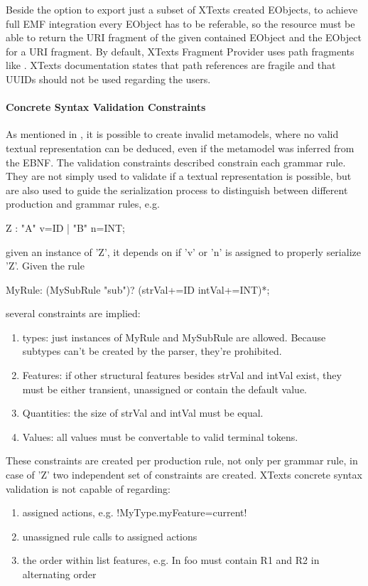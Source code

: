 Beside the option to export just a subset of XTexts created EObjects, to achieve full EMF integration every EObject has to be referable, so the resource must be able to return the URI fragment of the given contained EObject and the EObject for a URI fragment. By default, XTexts Fragment Provider  uses path fragments like . XTexts documentation states that path references are fragile and that UUIDs should not be used regarding the users. 

\paragraph{Concrete Syntax Validation Constraints}
As mentioned in \cite{MofCfg}, it is possible to create invalid metamodels, where no valid textual representation can be deduced, even if the metamodel was inferred from the EBNF. The validation constraints described constrain each grammar rule. They are not simply used to validate if a textual representation is possible, but are also used to guide the serialization process to distinguish between different production and grammar rules, e.g.
\begin{xtxt}
Z 	:  "A" v=ID  
	|  "B" n=INT;
\end{xtxt}
given an instance of 'Z', it depends on if 'v' or 'n' is assigned to properly serialize 'Z'.
Given the rule
\begin{xtxt}
MyRule:	({MySubRule} "sub")? (strVal+=ID intVal+=INT)*;
\end{xtxt}
several constraints are implied:
\begin{enumerate}
	\item types: just instances of MyRule and MySubRule are allowed. Because subtypes can't be created by the parser, they're prohibited. 
	\item Features: if other structural features besides strVal and intVal exist, they must be either transient, unassigned or contain the default value.
	\item Quantities: the size of strVal and intVal must be equal.
	\item Values: all values must be convertable to valid terminal tokens.
\end{enumerate}
These constraints are created per production rule, not only per grammar rule, in case of 'Z' two independent set of constraints are created.
XTexts concrete syntax validation is not capable of regarding:
\begin{enumerate}
	\item assigned actions, e.g. 
	\kode!{MyType.myFeature=current}!
	\item unassigned rule calls to assigned actions
	\item the order within list features, e.g. In  foo must contain R1 and R2 in alternating order
\end{enumerate}

